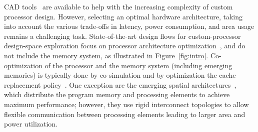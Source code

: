 CAD tools~\cite{synopsystool,tensilica,codasiptool} are available to help with the increasing complexity of custom processor design. However, selecting an optimal hardware architecture, taking into account the various trade-offs in latency, power consumption, and area usage remains a challenging task. State-of-the-art design flows for custom-processor design-space exploration focus on processor architecture optimization~\cite{Meloni2012,EusseSAMOS2014,Jozwiak2013,Karuri2009}, and do not include the memory system, as illustrated in Figure~\ref{fig:intro}. Co-optimization of the processor and the memory system (including emerging memories) is typically done by co-simulation and by optimization the cache replacement policy~\cite{4798259,7092595,6271803,Mittal13f}. 
One exception are the emerging spatial architectures~\cite{7284058,8686088}, which distribute the program memory and processing elements to achieve maximum performance; however, they use rigid interconnect topologies to allow flexible communication between processing elements leading to larger area and power utilization.

